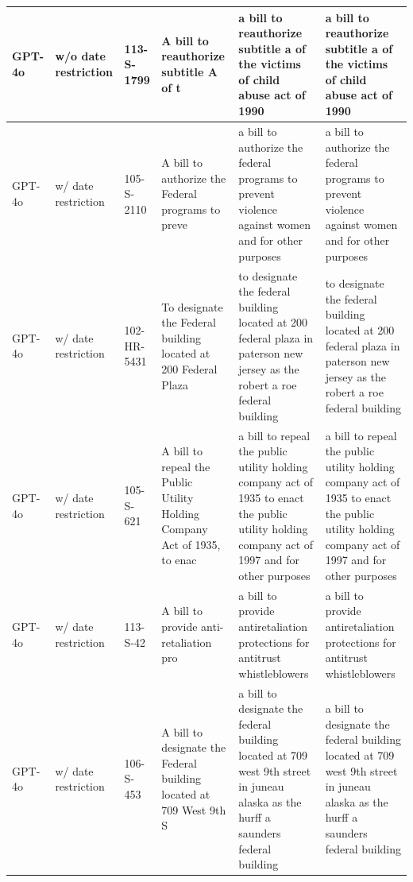 \begin{table}[!h]
\begin{tabular}[t]{
p{1.4cm}
p{1.4cm}
p{1.4cm}
p{3.2cm}
p{3.2cm}
p{3.2cm}
}
\midrule
GPT-4o & w/o date restriction & 113-S-1799 & A bill to reauthorize subtitle A of t & a bill to reauthorize subtitle a of the victims of child abuse act of 1990 & a bill to reauthorize subtitle a of the victims of child abuse act of 1990\\
\midrule
GPT-4o & w/ date restriction & 105-S-2110 & A bill to authorize the Federal programs to preve & a bill to authorize the federal programs to prevent violence against women and for other purposes & a bill to authorize the federal programs to prevent violence against women and for other purposes\\
\midrule
GPT-4o & w/ date restriction & 102-HR-5431 & To designate the Federal building located at 200 Federal Plaza & to designate the federal building located at 200 federal plaza in paterson new jersey as the robert a roe federal building & to designate the federal building located at 200 federal plaza in paterson new jersey as the robert a roe federal building\\
\midrule
GPT-4o & w/ date restriction & 105-S-621 & A bill to repeal the Public Utility Holding Company Act of 1935, to enac & a bill to repeal the public utility holding company act of 1935 to enact the public utility holding company act of 1997 and for other purposes & a bill to repeal the public utility holding company act of 1935 to enact the public utility holding company act of 1997 and for other purposes\\
\midrule
GPT-4o & w/ date restriction & 113-S-42 & A bill to provide anti-retaliation pro & a bill to provide antiretaliation protections for antitrust whistleblowers & a bill to provide antiretaliation protections for antitrust whistleblowers\\
\midrule
GPT-4o & w/ date restriction & 106-S-453 & A bill to designate the Federal building located at 709 West 9th S & a bill to designate the federal building located at 709 west 9th street in juneau alaska as the hurff a saunders federal building & a bill to designate the federal building located at 709 west 9th street in juneau alaska as the hurff a saunders federal building\\
\bottomrule
\end{tabular}
\end{table}

